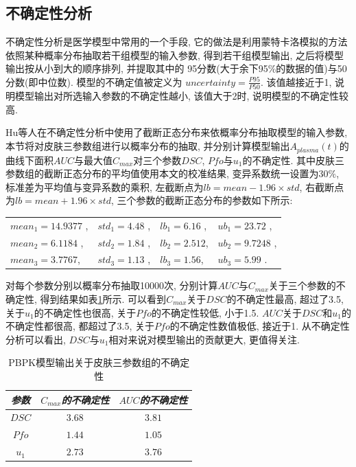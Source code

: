 \documentclass[a4paper,punct=banjiao,twoside]{ctexrep}
\theoremstyle{plain}
\theoremstyle{definition}
\theoremstyle{remark}
\begin{document}
\subsection{不确定性分析}

不确定性分析是医学模型中常用的一个手段, 它的做法是利用蒙特卡洛模拟的方法依照某种概率分布抽取若干组模型的输入参数, 得到若干组模型输出, 之后将模型输出按从小到大的顺序排列, 并提取其中的
95分数(大于余下95\%的数据的值)与50分数(即中位数)\cite{30}. 模型的不确定值被定义为
$uncertainty = \frac{P95}{P50}$. 该值越接近于1, 说明模型输出对所选输入参数的不确定性越小, 该值大于2时, 说明模型的不确定性较高\cite{30}.

Hu等人\cite{11}在不确定性分析中使用了截断正态分布来依概率分布抽取模型的输入参数, 本节将对皮肤三参数组进行以概率分布的抽取, 并分别计算模型输出$A_{plasma}(t)$的曲线下面积$AUC$与最大值$C_{max}$对三个参数$DSC$, $Pfo$与$u_1$的不确定性.
其中皮肤三参数组的截断正态分布的平均值使用本文的校准结果, 变异系数统一设置为$30\%$, 标准差为平均值与变异系数的乘积, 左截断点为$lb = mean - 1.96\times std$, 右截断点为$lb = mean + 1.96\times std$,
三个参数的截断正态分布的参数如下所示:
\begin{table}[htbp]
  \centering
  \begin{tabular}[t]{|l*{3}{l}}

    $mean_1 = 14.9377$ ,&$std_1 = 4.48$ ,&$lb_1 = 6.16$ ,&$ub_1 =23.72$ , \\ 
  
    $mean_2 = 6.1184$  ,&$std_2 = 1.84$ ,&$lb_2 = 2.512$, &$ ub_2 =9.7248$ , \\ 
  
    $mean_3 = 3.7767$, &$std_3 = 1.13$  ,&$lb_3 = 1.56$, &$ub_3 =5.99$ .\\ 
    
  \end{tabular}
\end{table}  

对每个参数分别以概率分布抽取10000次, 分别计算$AUC$与$C_{max}$关于三个参数的不确定性, 得到结果如表\ref{tab10}所示. 可以看到$C_{max}$关于$DSC$的不确定性最高, 超过了3.5, 关于$u_1$的不确定性也很高, 关于$Pfo$的不确定性较低, 小于1.5.  $AUC$关于$DSC$和$u_1$的不确定性都很高, 都超过了3.5, 关于$Pfo$的不确定性数值极低, 接近于1. 从不确定性分析可以看出, $DSC$与$u_1$相对来说对模型输出的贡献更大, 更值得关注.

\begin{table}[htbp]
  \centering
  \begin{tabular}[t]{c*{2}{c}}
    \hline
    \textit{参数} &$C_{max}$\textit{的不确定性}  &$AUC$\textit{的不确定性}\\
    \hline
    $DSC$ & $ 3.68$ & $3.81$  \\ 
    
    $Pfo$ & $  1.44$ &$  1.05$   \\ 
   
    $u_1$ & $  2.73$ &$  3.76$   \\ 
    
    \hline
  \end{tabular}
  \caption{\label{tab10}PBPK模型输出关于皮肤三参数组的不确定性} 
\end{table}  
\end{document}
